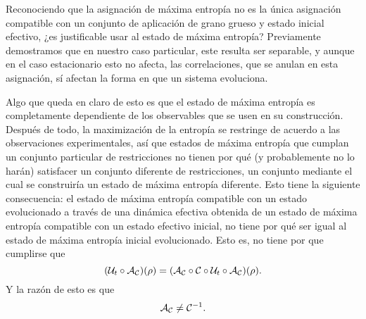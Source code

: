 Reconociendo que la asignación de máxima entropía no es la única asignación compatible con un conjunto de aplicación de grano grueso y estado inicial efectivo, ¿es justificable usar al estado de máxima entropía? Previamente demostramos que en nuestro caso particular, este resulta ser separable, y aunque en el caso estacionario esto no afecta, las correlaciones, que se anulan en esta asignación, sí afectan la forma en que un sistema evoluciona.

Algo que queda en claro de esto es que el estado de máxima entropía es completamente dependiente de los observables que se usen en su construcción. Después de todo, la maximización de la entropía se restringe de acuerdo a las observaciones experimentales, así que estados de máxima entropía que cumplan un conjunto particular de restricciones no tienen por qué (y probablemente no lo harán) satisfacer un conjunto diferente de restricciones, un conjunto mediante el cual se construiría un estado de máxima entropía diferente. Esto tiene la siguiente consecuencia: el estado de máxima entropía compatible con un estado evolucionado a través de una dinámica efectiva obtenida de un estado de máxima entropía compatible con un estado efectivo inicial, no tiene por qué ser igual al estado de máxima entropía inicial evolucionado. Esto es, no tiene por que cumplirse que
\begin{equation*}
    (\mathcal{U}_{t}\circ\mathcal{A}_{\mathcal{C}})(\rho) = (\mathcal{A}_{\mathcal{C}}\circ\mathcal{C} \circ \mathcal{U}_t \circ \mathcal{A}_{\mathcal{C}})(\rho).
\end{equation*}
Y la razón de esto es que
\begin{equation*}
    \mathcal{A}_{\mathcal{C}}\neq\mathcal{C}^{-1}.
\end{equation*}

